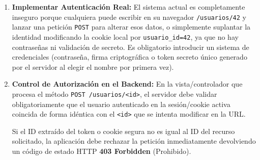 \begin{enumerate}
    \item \textbf{Implementar Autenticación Real:} El sistema actual es completamente inseguro porque cualquiera puede escribir en su navegador \texttt{/usuarios/42} y lanzar una petición \texttt{POST} para alterar esos datos, o simplemente suplantar la identidad modificando la cookie local por \texttt{usuario\_id=42}, ya que no hay contraseñas ni validación de secreto. Es obligatorio introducir un sistema de credenciales (contraseña, firma criptográfica o token secreto único generado por el servidor al elegir el nombre por primera vez).
    \item \textbf{Control de Autorización en el Backend:} En la vista/controlador que procesa el método \texttt{POST /usuarios/<id>}, el servidor debe validar obligatoriamente que el usuario autenticado en la sesión/cookie activa coincida de forma idéntica con el \texttt{<id>} que se intenta modificar en la URL. 
    
    Si el ID extraído del token o cookie segura no es igual al ID del recurso solicitado, la aplicación debe rechazar la petición inmediatamente devolviendo un código de estado HTTP \textbf{403 Forbidden} (Prohibido).
\end{enumerate}
